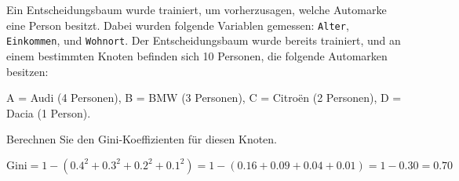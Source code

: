 \begin{myexercise}
    Ein Entscheidungsbaum wurde trainiert, um vorherzusagen, welche Automarke eine Person besitzt. Dabei wurden folgende Variablen gemessen: \texttt{Alter}, \texttt{Einkommen}, und \texttt{Wohnort}. Der Entscheidungsbaum wurde bereits trainiert, und an einem bestimmten Knoten befinden sich 10 Personen, die folgende Automarken besitzen:

    A = Audi (4 Personen), B = BMW (3 Personen), C = Citroën (2 Personen), D = Dacia (1 Person).

    Berechnen Sie den Gini-Koeffizienten für diesen Knoten.
    \begin{myanswer}
        \[
            \text{Gini} = 1 - (0.4^2 + 0.3^2 + 0.2^2 + 0.1^2) = 1 - (0.16 + 0.09 + 0.04 + 0.01) = 1 - 0.30 = 0.70
        \]
    \end{myanswer}
\end{myexercise}

